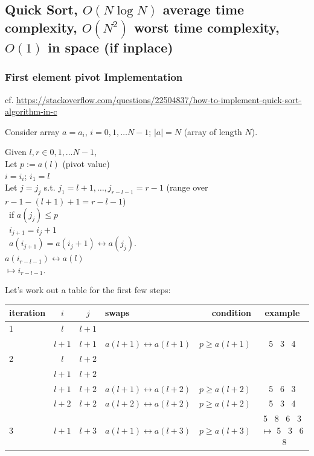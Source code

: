 \documentclass[10pt]{amsart}
\begin{document}
\begin{multicols*}{2}
\subsection{Quick Sort, $O(N \log{N})$ average time complexity, $O(N^2)$ worst time complexity, $O(1)$ in space (if inplace)}

\subsubsection{First element pivot Implementation}

cf. \url{https://stackoverflow.com/questions/22504837/how-to-implement-quick-sort-algorithm-in-c}

Consider array $a=a_i$, $i=0,1, \dots N-1$; $|a|=N$ (array of length $N$).

Given $l, r \in 0,1,\dots N-1$, \\
Let $p:= a(l)$ (pivot value) \\
$i=i_i$; $i_1=l$ \\
Let $j=j_j$ s.t. $j_1=l+1, \dots , j_{r-l-1} = r-1$ (range over $r-1 - (l+1)+1 = r-l-1$) \\
\qquad \, if $a(j_j) \leq p$ \\
\qquad \, \phantom{if} $i_{j+1} = i_j+1$ \\
\qquad \, \phantom{if} $a(i_{j+1}) = a(i_j+1) \leftrightarrow a(j_j)$. \\

$a(i_{r-l-1}) \leftrightarrow a(l)$ \\
$\mapsto i_{r-l-1}$.

Let's work out a table for the first few steps:
\begin{center}
	\begin{tabular}{ l | c | c | l | r | c }
		\hline
		iteration & $i$ & $j$ & swaps & condition & example \\ \hline
		1 & $l$ & $l+1$ & & & \\ \hline
		& $l + 1$ &  $l + 1$ & $a(l + 1) \leftrightarrow a(l+1)$ & $p\geq a(l+1)$ & 5 \, 3 \, 4 \\
		2 & $l$ & $l+2$ & & & \\
		& $l+1$ & $l+2$ & & & \\
		& $l + 1$ & $l+2$ & $a(l+1) \leftrightarrow a(l+2)$ & $p \geq a(l+2)$ & 5 \, 6 \, 3 \\
		& $l + 2$ & $l+ 2$ & $a(l+2) \leftrightarrow a(l+2)$ & $p \geq a(l+2)$ & 5 \, 3 \, 4 \\
		3 & $l+1$ & $l+3$ & $a(l+1) \leftrightarrow a(l+3)$ & $p\geq a(l+3)$ & 5 \, 8 \, 6 \, 3 $\mapsto $ 5 \, 3 \, 6 \, 8 \\
		\hline
	\end{tabular}
\end{center}


\end{multicols*}
\end{document}
